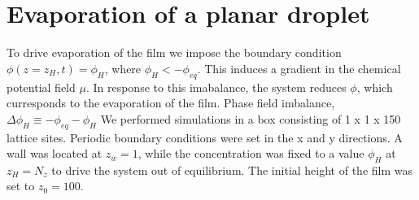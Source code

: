 \documentclass{article}
\begin{document}
\section{Evaporation of a planar droplet}

To drive evaporation of the film we impose the boundary condition $\phi(z=z_{H},t)=\phi_{H}$, where $\phi_{H} < -\phi_{eq}$. This induces a gradient in the chemical potential field $\mu$. In response to this imabalance, the system reduces $\phi$, which curresponds to the evaporation of the film\cite{paper:evaporation}.
Phase field imbalance, $\Delta\phi_{H} \equiv -\phi_{eq} - \phi_{H}$
\newline
We performed simulations in a box consisting of  1 x 1 x 150 lattice sites. Periodic boundary conditions were set in the x and
y directions. A wall was located at $ z_{w} = 1 $, while the concentration
was fixed to a value $ \phi_{H}$ at $z_{H} = N_{z} $ to drive the system out of equilibrium. The initial height of the film was set to $z_{0} = 100$. 
\end{document}
